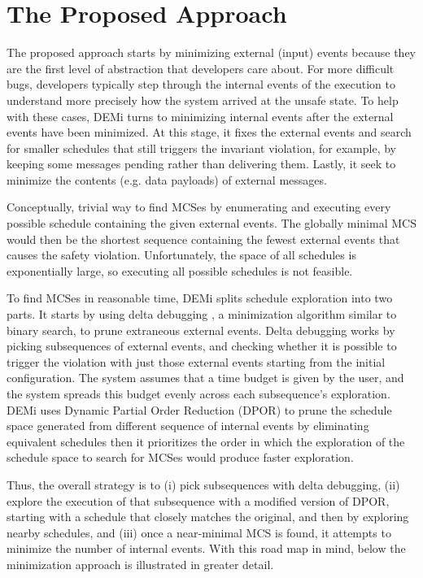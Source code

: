 \section{The Proposed Approach}
The proposed approach starts by minimizing external (input) events because they are the first level of abstraction that developers care about. For more difficult bugs, developers typically step through the internal events of the execution to understand  more precisely how the system arrived at the unsafe state. To help with these cases, DEMi turns to minimizing internal events after the external events have been minimized. At this stage, it fixes the external events and search for smaller schedules that still triggers the invariant violation, for example, by keeping some messages pending rather than delivering them. Lastly, it seek to minimize the contents (e.g. data payloads) of external messages.

Conceptually, trivial way to  find MCSes by enumerating and executing every possible schedule containing the given external events. The globally minimal MCS would then be the shortest sequence containing the fewest external events that causes the safety violation. Unfortunately, the space of all schedules is exponentially large, so executing all possible schedules is not feasible.

To find MCSes in reasonable time, DEMi splits schedule exploration into two parts. It starts by using delta debugging \cite{5}, a minimization algorithm similar to binary search, to prune extraneous external events. Delta debugging works by picking subsequences of external events, and checking whether it is possible to trigger the violation with just those external events starting from the initial configuration. The system assumes that a time budget is given by the user, and the system spreads this budget evenly across each subsequence's exploration. DEMi uses Dynamic Partial Order Reduction (DPOR) to prune the schedule space generated from different sequence of internal events by eliminating equivalent schedules then it prioritizes the order in which the exploration of the schedule space to search for MCSes would produce faster exploration.

Thus, the overall strategy is to (i) pick subsequences with delta debugging, (ii) explore the execution of that subsequence with a modified version of DPOR, starting with a schedule that closely matches the original, and then by exploring nearby schedules, and (iii) once a near-minimal MCS is found, it attempts to minimize the number of internal events. With this road map in mind, below the minimization approach is illustrated in greater detail.

